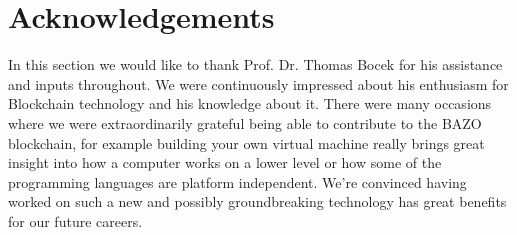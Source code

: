\chapter*{Acknowledgements}
\thispagestyle{main} %

In this section we would like to thank Prof. Dr. Thomas Bocek for his assistance and inputs throughout. We were continuously impressed about his enthusiasm for Blockchain technology and his knowledge about it. There were many occasions where we were extraordinarily grateful being able to contribute to the BAZO blockchain, for example building your own virtual machine really brings great insight into how a computer works on a lower level or how some of the programming languages are platform independent. We're convinced having worked on such a new and possibly groundbreaking technology has great benefits for our future careers.